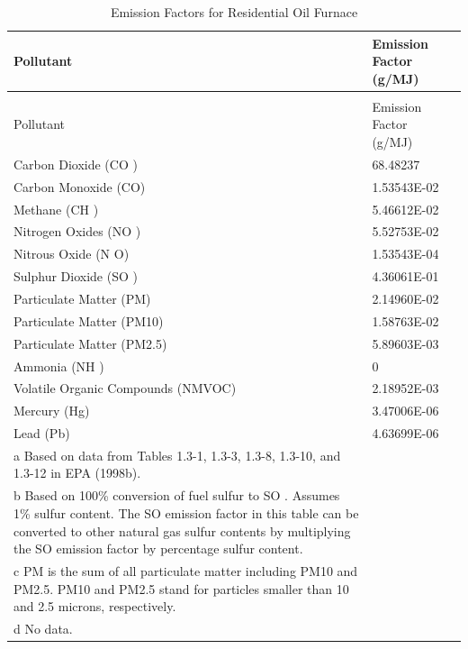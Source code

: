 \begin{longtable}[c]{p{4.5in}p{1.5in}}
\caption{Emission Factors for Residential Oil Furnace \label{table:emission-factors-for-residential-oil-furnace}} \tabularnewline
\toprule 
Pollutant & Emission Factor  ~~ (g/MJ) \tabularnewline
\midrule
\endfirsthead

\caption[]{Emission Factors for Residential Oil Furnace} \tabularnewline
\toprule 
Pollutant & Emission Factor  ~~ (g/MJ) \tabularnewline
\midrule
\endhead

Carbon Dioxide (CO  ) & 68.48237 \tabularnewline
Carbon Monoxide (CO) & 1.53543E-02 \tabularnewline
Methane (CH  ) & 5.46612E-02 \tabularnewline
Nitrogen Oxides (NO  ) & 5.52753E-02 \tabularnewline
Nitrous Oxide (N  O) & 1.53543E-04 \tabularnewline
Sulphur Dioxide (SO  ) & 4.36061E-01 \tabularnewline
Particulate Matter (PM) & 2.14960E-02 \tabularnewline
Particulate Matter (PM10) & 1.58763E-02 \tabularnewline
Particulate Matter (PM2.5) & 5.89603E-03 \tabularnewline
Ammonia (NH  ) & 0 \tabularnewline
Volatile Organic Compounds (NMVOC) & 2.18952E-03 \tabularnewline
Mercury (Hg) & 3.47006E-06 \tabularnewline
Lead (Pb) & 4.63699E-06 \tabularnewline
a Based on data from Tables 1.3-1, 1.3-3, 1.3-8, 1.3-10, and 1.3-12 in EPA (1998b). \tabularnewline
b Based on 100\% conversion of fuel sulfur to SO  . Assumes 1\% sulfur content. The SO   emission factor in this table can be converted to other natural gas sulfur contents by multiplying the SO   emission factor by percentage sulfur content. \tabularnewline
c PM is the sum of all particulate matter including PM10 and PM2.5. PM10 and PM2.5 stand for particles smaller than 10 and 2.5 microns, respectively. \tabularnewline
d No data. \tabularnewline
\bottomrule
\end{longtable}

